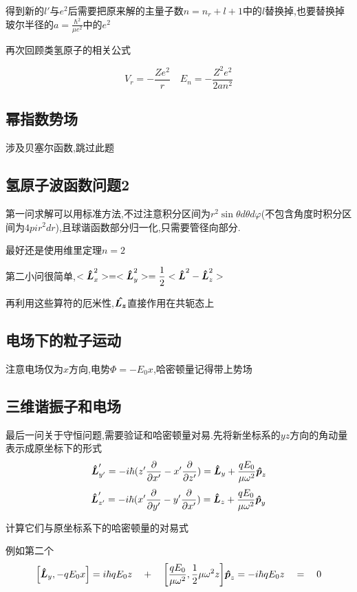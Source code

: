 \documentclass{article}
\begin{document}
        得到新的$l'$与$e^{2}$后需要把原来解的主量子数$ n = n_{r} + l + 1$中的$l$替换掉,也要替换掉玻尔半径的$ a = \frac{\hbar^{2}}{\mu e^{2}} $中的$e^{2}$

        再次回顾类氢原子的相关公式

        $$ V_{r} = - \dfrac{Ze^{2}}{r}  \quad  E_{n} = - \dfrac{Z^{2}e^{2} }{2an^{2}} $$

        \subsection{幂指数势场}
            涉及贝塞尔函数,跳过此题
        
        \subsection{氢原子波函数问题2}
            第一问求解可以用标准方法,不过注意积分区间为$r^{2}\sin{\theta}d\theta d\varphi$(不包含角度时积分区间为$4pir^{2}dr$),且球谐函数部分归一化,只需要管径向部分.

            最好还是使用维里定理$n=2$

            第二小问很简单,$<\vu*{L}_{x}^{2}> = <\vu*{L}_{y}^{2}> = \dfrac{1}{2} < \vu*{L}^{2} - \vu*{L}_{z}^{2} > $

            再利用这些算符的厄米性,$\vu*{{L}_{z}}$直接作用在共轭态上
        
        \subsection{电场下的粒子运动}
            注意电场仅为$x$方向,电势$\Phi = - E_{0} x $,哈密顿量记得带上势场
        
        \subsection{三维谐振子和电场}
            最后一问关于守恒问题,需要验证和哈密顿量对易.先将新坐标系的$yz$方向的角动量表示成原坐标下的形式
            $$ \vu*{L}_{y'}' = -i\hbar (z' \pdv{x'} - x' \pdv{z'} ) = \vu*{L}_{y} + \dfrac{qE_{0}}{\mu \omega^{2}} \vu*{p}_{z} $$
            $$ \vu*{L}_{z'}' = -i\hbar (x' \pdv{y'} - y' \pdv{x'} ) = \vu*{L}_{z} + \dfrac{qE_{0}}{\mu \omega^{2}} \vu*{p}_{y} $$

            计算它们与原坐标系下的哈密顿量的对易式

            例如第二个
            $$ 
            \comm{\vu*{L}_{y}}{-qE_{0}x} = i\hbar q E_{0}z \quad + 
            \quad \comm{\frac{qE_{0}}{\mu \omega^{2}}}{ \frac{1}{2} \mu \omega^{2}z} \vu*{p}_{z} = -i \hbar q E_{0} z \quad  = \quad 0
            $$
\end{document}
